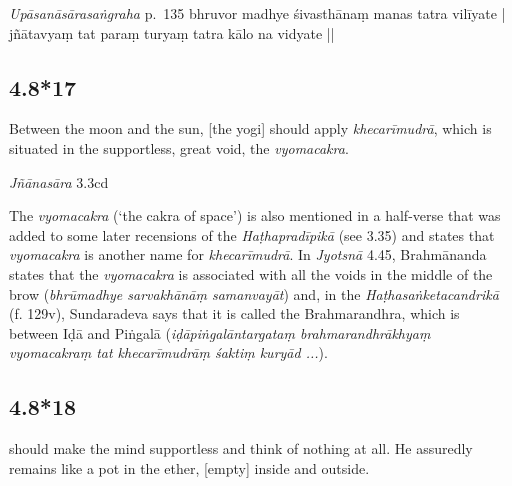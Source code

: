 \begin{ekdosis}

\begin{testimonia}[hp04_008_16]
\emph{Upāsanāsārasaṅgraha} p.~135
bhruvor madhye śivasthānaṃ manas tatra vilīyate |
jñātavyaṃ tat paraṃ turyaṃ tatra kālo na vidyate ||
\end{testimonia}


\subsection*{4.8*17}
\begin{translation}[hp04_008_17]
Between the moon and the sun, [the yogi] should apply \emph{khecarīmudrā}, which is situated in the supportless, great void, the \emph{vyomacakra}.
\end{translation}

\begin{sources}[hp04_008_17]
\emph{Jñānasāra} 3.3cd
\begin{versinnote}
\end{versinnote}

\end{sources}


\begin{philcomm}[hp04_008_17]
The \emph{vyomacakra} (`the cakra of space') is also mentioned in a half-verse that was added to some later recensions of the \emph{Haṭhapradīpikā} (see 3.35) and states that \emph{vyomacakra} is another name for \emph{khecarīmudrā}. In \emph{Jyotsnā} 4.45, Brahmānanda states that the \emph{vyomacakra} is associated with all the voids in the middle of the brow (\emph{bhrūmadhye sarvakhānāṃ samanvayāt}) and, in the \emph{Haṭhasaṅketacandrikā} (f. 129v), Sundaradeva says that it is called the Brahmarandhra, which is between Iḍā and Piṅgalā (\emph{iḍāpiṅgalāntargataṃ brahmarandhrākhyaṃ vyomacakraṃ tat khecarīmudrāṃ śaktiṃ kuryād ...}). 
%
\end{philcomm}

\subsection*{4.8*18}
\begin{translation} should make the mind supportless and think of nothing at all. He assuredly remains like a pot in the ether, [empty] inside and outside.
\end{translation}


\end{ekdosis}
